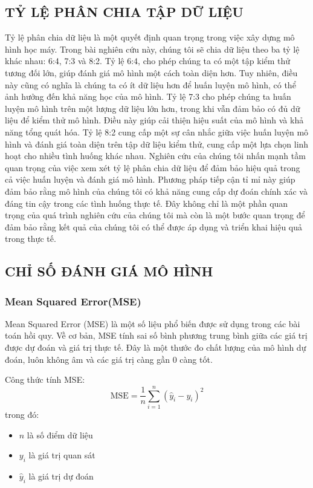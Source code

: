\documentclass[conference]{IEEEtran}
\begin{document}
\subsection{TỶ LỆ PHÂN CHIA TẬP DỮ LIỆU}
 Tỷ lệ phân chia dữ liệu là một quyết định quan trọng trong việc xây dựng mô hình học máy. Trong bài nghiên cứu này, chúng tôi sẽ chia dữ liệu theo ba tỷ lệ khác nhau: 6:4, 7:3 và 8:2.
 Tỷ lệ 6:4, cho phép chúng ta có một tập kiểm thử tương đối lớn, giúp đánh giá mô hình một cách toàn diện hơn. Tuy nhiên, điều này cũng có nghĩa là chúng ta có ít dữ liệu hơn để huấn luyện mô hình, có thể ảnh hưởng đến khả năng học của mô hình.
 Tỷ lệ 7:3 cho phép chúng ta huấn luyện mô hình trên một lượng dữ liệu lớn hơn, trong khi vẫn đảm bảo có đủ dữ liệu để kiểm thử mô hình. Điều này giúp cải thiện hiệu suất của mô hình và khả năng tổng quát hóa.
 Tỷ lệ 8:2 cung cấp một sự cân nhắc giữa việc huấn luyện mô hình và đánh giá toàn diện trên tập dữ liệu kiểm thử, cung cấp một lựa chọn linh hoạt cho nhiều tình huống khác nhau.
 Nghiên cứu của chúng tôi nhấn mạnh tầm quan trọng của việc xem xét tỷ lệ phân chia dữ liệu để đảm bảo hiệu quả trong cả việc huấn luyện và đánh giá mô hình. Phương pháp tiếp cận tỉ mỉ này giúp đảm bảo rằng mô hình của chúng tôi có khả năng cung 
 cấp dự đoán chính xác và đáng tin cậy trong các tình huống thực tế. Đây không chỉ là một phần quan trọng của quá trình nghiên cứu của chúng tôi mà còn là một bước quan trọng để đảm bảo rằng kết quả của chúng tôi có thể được áp dụng và triển khai hiệu quả trong thực tế.

\subsection{CHỈ SỐ ĐÁNH GIÁ MÔ HÌNH}
\subsubsection{Mean Squared Error(MSE)}


Mean Squared Error (MSE) là một số liệu phổ biến được sử dụng trong các bài toán hồi quy. Về cơ bản, MSE tính sai số bình phương trung bình giữa các giá trị được dự đoán và giá trị thực tế. Đây là một thước đo chất lượng của mô hình dự đoán, luôn không âm và các giá trị càng gần 0 càng tốt.

Công thức tính MSE:
\[
\text{MSE} = \frac{1}{n} \sum_{i=1}^{n} (\hat{y}_i - y_i)^2
\]
trong đó:
\begin{itemize}
    \item $n$ là số điểm dữ liệu
    \item $y_i$ là giá trị quan sát
    \item $\hat{y}_i$ là giá trị dự đoán
\end{itemize}
\end{document}
